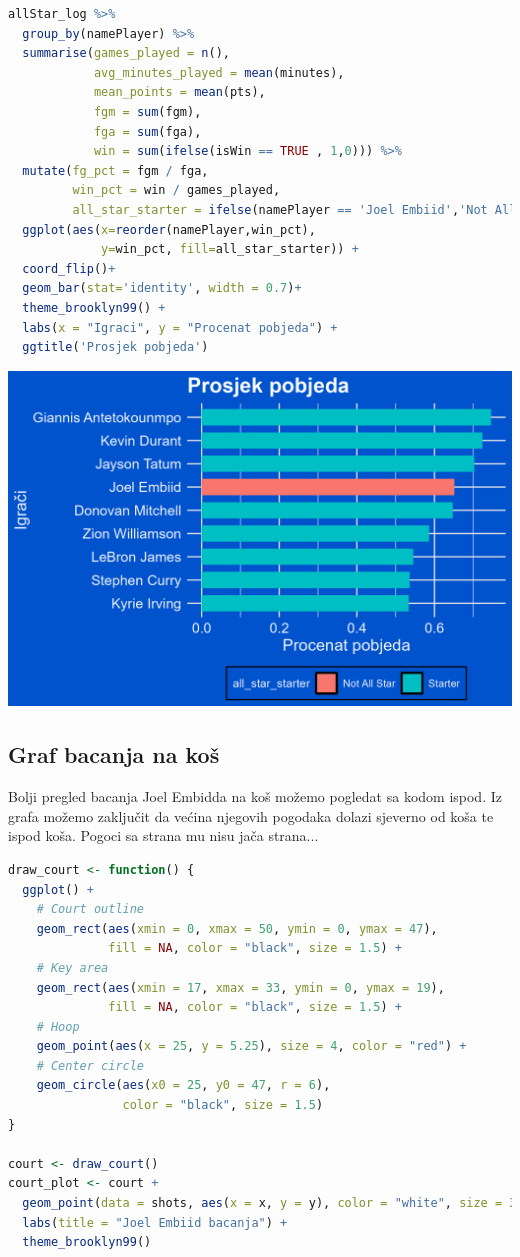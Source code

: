 \documentclass[letterpaper,11pt,leqno]{article}
\begin{document}
\begin{lstlisting}[language=R]
allStar_log %>% 
  group_by(namePlayer) %>% 
  summarise(games_played = n(),
            avg_minutes_played = mean(minutes),
            mean_points = mean(pts),
            fgm = sum(fgm),
            fga = sum(fga),
            win = sum(ifelse(isWin == TRUE , 1,0))) %>% 
  mutate(fg_pct = fgm / fga,
         win_pct = win / games_played,
         all_star_starter = ifelse(namePlayer == 'Joel Embiid','Not All Star' , 'Starter')) %>% 
  ggplot(aes(x=reorder(namePlayer,win_pct),
             y=win_pct, fill=all_star_starter)) + 
  coord_flip()+
  geom_bar(stat='identity', width = 0.7)+  
  theme_brooklyn99() + 
  labs(x = "Igraci", y = "Procenat pobjeda") + 
  ggtitle('Prosjek pobjeda')
\end{lstlisting}

\begin{center}
    \includegraphics[scale=0.9]{ProcenatPobjeda.png}
\end{center}


\subsection{Graf bacanja na koš} 

Bolji pregled bacanja Joel Embidda na koš možemo pogledat sa kodom ispod. Iz grafa možemo zaključit da većina njegovih pogodaka dolazi sjeverno od koša te ispod koša. Pogoci sa strana mu nisu jača strana...

\begin{lstlisting}[language=R]
draw_court <- function() {
  ggplot() +
    # Court outline
    geom_rect(aes(xmin = 0, xmax = 50, ymin = 0, ymax = 47), 
              fill = NA, color = "black", size = 1.5) +
    # Key area
    geom_rect(aes(xmin = 17, xmax = 33, ymin = 0, ymax = 19), 
              fill = NA, color = "black", size = 1.5) +
    # Hoop
    geom_point(aes(x = 25, y = 5.25), size = 4, color = "red") +
    # Center circle
    geom_circle(aes(x0 = 25, y0 = 47, r = 6), 
                color = "black", size = 1.5)
}

court <- draw_court()
court_plot <- court +
  geom_point(data = shots, aes(x = x, y = y), color = "white", size = 3) +
  labs(title = "Joel Embiid bacanja") +
  theme_brooklyn99()

\end{lstlisting}
\end{document}
